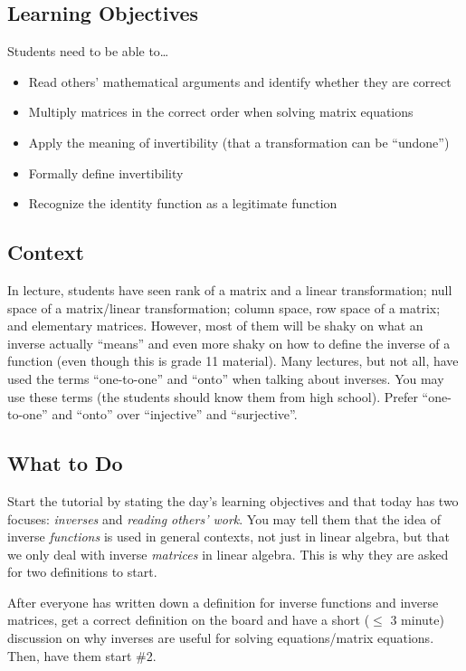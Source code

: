 \documentclass[red]{tutorial}
\theoremstyle{definition}
\theoremstyle{theorem}
\begin{document}
	\begin{instructions}


\subsection*{Learning Objectives}
	Students need to be able to\ldots
	\begin{itemize}
		\item Read others' mathematical arguments and identify whether they are correct
		\item Multiply matrices in the correct order when solving matrix equations
		\item Apply the meaning of invertibility (that a transformation can be ``undone'')
		\item Formally define invertibility
		\item Recognize the identity function as a legitimate function
	\end{itemize}

\subsection*{Context}
	In lecture, students have seen rank of a matrix and a linear transformation; null space of a matrix/linear
		transformation;	column space, row space of a matrix; and elementary matrices. However, most
		of them will be shaky on what an inverse actually ``means'' and even more shaky on how to
		define the inverse of a function (even though this is grade 11 material). Many lectures,
		but not all, have used the terms ``one-to-one'' and ``onto'' when talking about inverses.
		You may use these terms (the students should know them from high school). Prefer ``one-to-one''
		and ``onto'' over ``injective'' and ``surjective''.

\subsection*{What to Do}
	Start the tutorial by stating the day's learning objectives and that today has two focuses: \emph{inverses}
		and \emph{reading others' work}. You may tell them that the idea of inverse \emph{functions} is used
		in general contexts, not just in linear algebra, but that we only
		deal with inverse \emph{matrices} in linear algebra. This is why they are asked for two
		definitions to start.

		After everyone has written down a definition for inverse functions and inverse matrices, 
		get a correct definition on the board and have a short ($\leq $ 3 minute) discussion on why
		inverses are useful for solving equations/matrix equations. Then, have them start \#2.


\end{instructions}
\end{document}
